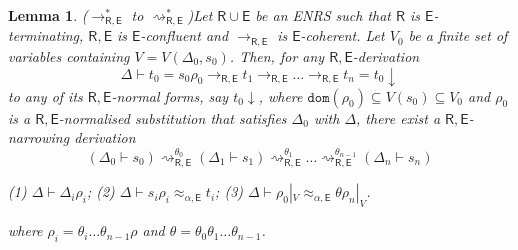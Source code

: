\documentclass[submission,copyright,creativecommons]{eptcs}
\newcommand{\ealeq}{\approx_{\alpha,\theory{E}}}
\newcommand{\alert}[1]{\textcolor{red}{#1}}
\newcommand{\theory}[1]{\ensuremath{\mathsf{#1}}}
\theoremstyle{plain}
\newtheorem{lemma}[theorem]{Lemma}
\theoremstyle{definition}
\theoremstyle{remark}
\begin{document}
\begin{lemma}{($\to^*_{\theory{R,E}}$ to $\rightsquigarrow^*_{\theory{R,E}}$)}\label{theo:rewritenarr}
Let $\theory{R}{\cup}\theory{E}$ be an ENRS such that $\theory{R}$ is 
\theory{E}-terminating, \theory{R,E} is \theory{E}-confluent
and $\to_{\theory{R,E}}$ is $\theory{E}$-coherent. Let $V_0$ be a finite set of variables containing $V=V(\Delta_0,s_0)$. Then, for any $\theory{R,E}$-derivation 
$$\Delta \vdash t_0 = s_0\rho_0\rightarrow_{\theory{R,E}} t_1\rightarrow_{\theory{R,E}}\ldots \rightarrow_{\theory{R,E}} t_n=t_0{\downarrow}$$
to any of its $\theory{R,E}$-normal forms, say $t_0{\downarrow}$, where $\texttt{dom}(\rho_0) \subseteq V(s_0) \subseteq V_0$ and $\rho_0$ is a $\theory{R,E}$-normalised substitution that satisfies $\Delta_0$ with $\Delta$, there exist a $\theory{R,E}$-narrowing derivation 
$$(\Delta_0\vdash s_0) \rightsquigarrow^{\theta_0}_{\theory{R,E}} (\Delta_1 \vdash s_1) \rightsquigarrow^{\theta_1}_{\theory{R,E}}  \ldots \rightsquigarrow^{\theta_{n-1}}_{\theory{R,E}} (\Delta_n \vdash s_n) $$
\begin{center}
(1) $\Delta\vdash \Delta_i\rho_i$; \qquad 
(2)  $\Delta \vdash s_i\rho_i \ealeq t_i$;\qquad 
(3)  $\Delta \vdash \rho_0|_V \ealeq \theta\rho_n|_V$.
\end{center}
where  $\rho_{i}=\theta_i\ldots \theta_{n-1}\rho$ and  $\theta=\theta_0\theta_1\ldots \theta_{n-1}$.
\end{lemma}
\end{document}
